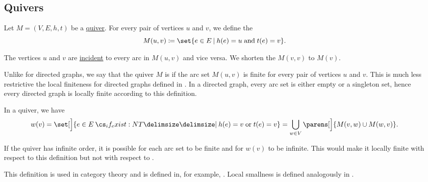\subsection{Quivers}\label{subsec:quivers}

\begin{definition}\label{def:quiver_arc_set}
  Let \( M = (V, E, h, t) \) be a \hyperref[def:graph/quiver]{quiver}. For every pair of vertices \( u \) and \( v \), we define the 
  \begin{equation}\label{eq:def:quiver_arc_set}
    M(u, v) \coloneqq \set{ e \in E \given h(e) = u \T{and} t(e) = v }.
  \end{equation}

  The vertices \( u \) and \( v \) are \hyperref[def:graph/adjacent_vertices]{incident} to every arc in \( M(u, v) \) and vice versa. We shorten the  \( M(v, v) \) to \( M(v) \).
\end{definition}

\begin{definition}\label{def:locally_finite_quiver}
  Unlike for directed graphs, we say that the quiver \( M \) is  if the arc set \( M(u, v) \) is finite for every pair of vertices \( u \) and \( v \). This is much less restrictive the local finiteness for directed graphs defined in . In a directed graph, every arc set is either empty or a singleton set, hence every directed graph is locally finite according to this definition.

  In a quiver, we have
  \begin{equation*}
    w(v)
    =
    \set[\Big]{ e \in E \given* h(e) = v \T{or} t(e) = v }
    =
    \bigcup_{w \in V} \parens[\Big]{ M(v, w) \cup M(w, v) }.
  \end{equation*}

  If the quiver has infinite order, it is possible for each arc set to be finite and for \( w(v) \) to be infinite. This would make it locally finite with respect to this definition but not with respect to .

  This definition is used in category theory and is defined in, for example, \cite{nLab:finite_category}. Local smallness is defined analogously in \cite[75]{Leinster2016Basic}.
\end{definition}

